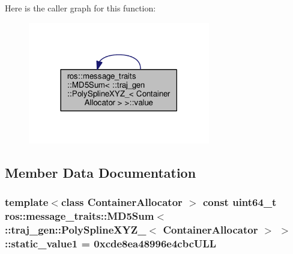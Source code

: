 Here is the caller graph for this function\+:
\nopagebreak
\begin{figure}[H]
\begin{center}
\leavevmode
\includegraphics[width=225pt]{structros_1_1message__traits_1_1_m_d5_sum_3_01_1_1traj__gen_1_1_poly_spline_x_y_z___3_01_container_allocator_01_4_01_4_a3d6191b185ef7291953276217087136b_icgraph}
\end{center}
\end{figure}




\subsection{Member Data Documentation}
\subsubsection[{\texorpdfstring{static\+\_\+value1}{static_value1}}]{\setlength{\rightskip}{0pt plus 5cm}template$<$class Container\+Allocator $>$ const uint64\+\_\+t ros\+::message\+\_\+traits\+::\+M\+D5\+Sum$<$ \+::{\bf traj\+\_\+gen\+::\+Poly\+Spline\+X\+Y\+Z\+\_\+}$<$ Container\+Allocator $>$ $>$\+::static\+\_\+value1 = 0xcde8ea48996e4cbc\+U\+LL\hspace{0.3cm}{\ttfamily [static]}}\hypertarget{structros_1_1message__traits_1_1_m_d5_sum_3_01_1_1traj__gen_1_1_poly_spline_x_y_z___3_01_container_allocator_01_4_01_4_a6e094b8beb8470216f994cadea40f999}{}\label{structros_1_1message__traits_1_1_m_d5_sum_3_01_1_1traj__gen_1_1_poly_spline_x_y_z___3_01_container_allocator_01_4_01_4_a6e094b8beb8470216f994cadea40f999}


